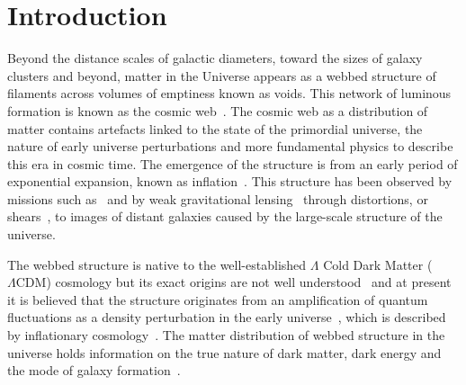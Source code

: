 \documentclass[twocolumn]{article}
\numberwithin{equation}{section}
\begin{document}


\section{Introduction}
Beyond the distance scales of galactic diameters, toward the sizes of galaxy clusters and beyond, matter in the Universe 
appears as a webbed structure of filaments across volumes of emptiness known as voids. This network of luminous formation 
is known as the cosmic web~\cite{bond_cw1, Coles_cw2, Forero_cw3, Dietrich_cw4, cw_phenomenon}. The cosmic web as a 
distribution of matter contains artefacts linked to the state of the primordial universe, the nature of early universe 
perturbations and more fundamental physics to describe this era in cosmic time. The emergence of the structure is from 
an early period of exponential expansion, known as inflation~\cite{inflation_cosmo2}. This structure has been observed by 
missions such as~\cite{sdss1, 2df} and by weak gravitational lensing~\cite{glens_book} through distortions, or 
shears~\cite{shear_review}, to images of distant galaxies caused by the large-scale structure of the universe. 

The webbed structure is native to the well-established $\Lambda$ Cold Dark Matter ($\Lambda \text{CDM}$) cosmology but 
its exact origins are not well understood~\cite{class_perturbs} and at present it is believed that the structure originates 
from an amplification of quantum fluctuations as a density perturbation in the early universe~\cite{perturbation_theory}, 
which is described by inflationary cosmology~\cite{inflation_cosmology}. The matter distribution of webbed structure in 
the universe holds information on the true nature of dark matter, dark energy and the mode of galaxy
formation~\cite{DarkEnergySurvey, kids_lensing, kids_cosmo, gal_formation, gal_formation2}.
\end{document}
